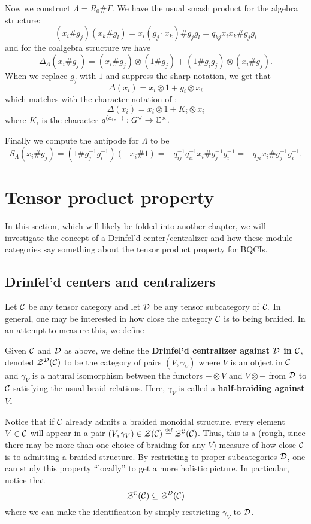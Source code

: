 \documentclass [11pt, proquest] {uwthesis}[2020/02/24]
\begin{document}
    Now we construct $\Lambda=R_0\#\Gamma.$ We have the usual smash product for the algebra structure:
    \[(x_i\#g_j)(x_k\#g_l)=x_i(g_j\cdot x_k)\#g_jg_l=q_{kj}x_ix_k\#g_jg_l\]
    and for the coalgebra structure we have
    \[\Delta_\Lambda(x_i\# g_j)=(x_i\# g_j)\otimes(1\# g_j) + (1\# g_ig_j)\otimes(x_i\# g_j).\]
    When we replace $g_j$ with $1$ and suppress the sharp notation, we get that 
    \[\Delta(x_i)=x_i\otimes 1+g_i\otimes x_i\]
    which matches with the character notation of \cite{negron-pevtsovaI}:
    \[\Delta(x_i)=x_i\otimes 1+K_i\otimes x_i\]
    where $K_i$ is the character $q^{(e_i,-)}:G^\vee\to\mathbb{C}^\times.$
    
    Finally we compute the antipode for $\Lambda$ to be
    \[S_\Lambda(x_i\#g_j)=(1\# g_j^{-1}g_i^{-1})(-x_i\# 1)=-q_{ij}^{-1}q_{ii}^{-1}x_i\#g_j^{-1}g_i^{-1}=-q_{ji}x_i\#g_j^{-1}g_i^{-1}.\]




\chapter{Tensor product property}
    In this section, which will likely be folded into another chapter, we will investigate the concept of a Drinfel'd center/centralizer and how these module categories say something about the tensor product property for BQCIs.
    
\section{Drinfel'd centers and centralizers}
    Let $\mathcal{C}$ be any tensor category and let $\mathcal{D}$ be any tensor subcategory of $\mathcal{C}.$ In general, one may be interested in how close the category $\mathcal{C}$ is to being braided. In an attempt to measure this, we define
    \begin{defn}\label{def:centralizers}
        Given $\mathcal{C}$ and $\mathcal{D}$ as above, we define the \textbf{Drinfel'd centralizer against $\mathcal{D}$ in $\mathcal{C}$}, denoted $\mathcal{Z}^{\mathcal{D}}(\mathcal{C})$ to be the category of pairs $(V,\gamma_V)$ where $V$ is an object in $\mathcal{C}$ and $\gamma_V$ is a natural isomorphism between the functors $-\otimes V$ and $V\otimes -$ from $\mathcal{D}$ to $\mathcal{C}$ satisfying the usual braid relations. Here, $\gamma_V$ is called a \textbf{half-braiding against $V$.}
    \end{defn}
    \begin{rmk}
        Notice that if $\mathcal{C}$ already admits a braided monoidal structure, every element $V\in\mathcal{C}$ will appear in a pair $(V,\gamma_V)\in \mathcal{Z}(\mathcal{C})\stackrel{\text{\tiny def}}{=}\mathcal{Z}^{\mathcal{C}}(\mathcal{C})$. Thus, this is a (rough, since there may be more than one choice of braiding for any $V$) measure of how close $\mathcal{C}$ is to admitting a braided structure. By restricting to proper subcategories $\mathcal{D}$, one can study this property ``locally'' to get a more holistic picture. In particular, notice that
        \[\mathcal{Z}^{\mathcal{C}}(\mathcal{C})\subseteq \mathcal{Z}^{\mathcal{D}}(\mathcal{C})\]
        where we can make the identification by simply restricting $\gamma_V$ to $\mathcal{D}$.
    \end{rmk}
    
\end{document}
